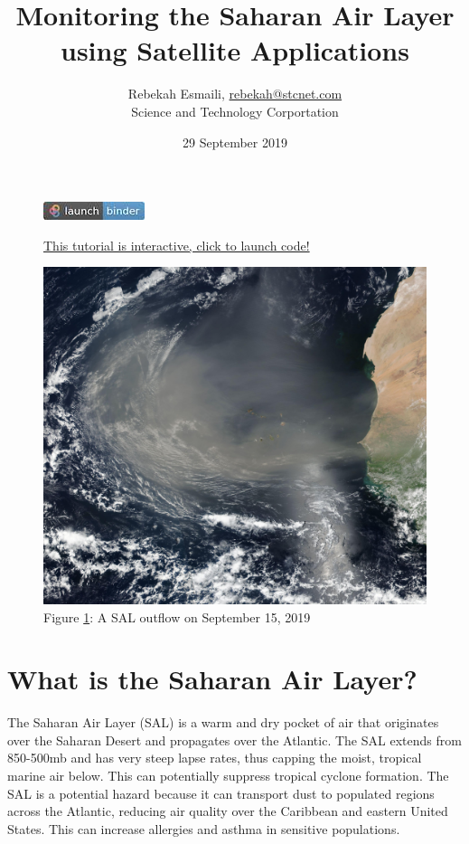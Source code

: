 \documentclass[11pt]{article}
\title{Monitoring the Saharan Air Layer using Satellite Applications}
\author{Rebekah Esmaili, \href{mailto:rebekah@stcnet.com}{rebekah@stcnet.com}
    \\ Science and Technology Corportation}
\date{29 September 2019}
\makeatletter
\def\maxwidth{\ifdim\Gin@nat@width>\linewidth\linewidth
    \else\Gin@nat@width\fi}
\let\Oldincludegraphics\includegraphics
\renewcommand{\includegraphics}[1]{\Oldincludegraphics[width=.8\maxwidth]{#1}}
\makeatother
\begin{document}
    \maketitle


\begin{figure}[h!]
\centering
\href{https://mybinder.org/v2/gh/resmaili/nucaps-sal/master}{\includegraphics{images/badge_logo.jpg}}
\caption*{\href{https://mybinder.org/v2/gh/resmaili/nucaps-sal/master}{This tutorial is interactive, click to launch code!}}
\end{figure}


\begin{figure}
\centering
\includegraphics{images/SAL.jpeg}
\caption{Figure \ref{fig:sal}: A SAL outflow on September 15, 2019}
\label{fig:sal}
\end{figure}

\section{What is the Saharan Air
Layer?}\label{what-is-the-saharan-air-layer}

The Saharan Air Layer (SAL) is a warm and dry pocket of air that
originates over the Saharan Desert and propagates over the Atlantic. The
SAL extends from 850-500mb and has very steep lapse rates, thus capping
the moist, tropical marine air below. This can potentially suppress tropical
cyclone formation. The SAL is a potential hazard because it can
transport dust to populated regions across the Atlantic, reducing
air quality over the Caribbean and eastern United States. This can increase allergies and asthma in sensitive populations.
\end{document}
